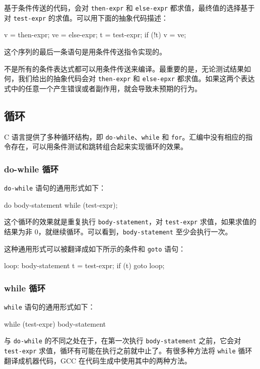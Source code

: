 基于条件传送的代码，会对 \verb|then-expr| 和 \verb|else-expr| 都求值，最终值的选择基于对 \verb|test-expr| 的求值。可以用下面的抽象代码描述：
\begin{cppcode}
v = then-expr;
ve = else-expr;
t = test-expr;
if (!t) v = ve;
\end{cppcode}
这个序列的最后一条语句是用条件传送指令实现的。

不是所有的条件表达式都可以用条件传送来编译。最重要的是，无论测试结果如何，我们给出的抽象代码会对 \verb|then-expr| 和 \verb|else-epxr| 都求值。如果这两个表达式中的任意一个产生错误或者副作用，就会导致未预期的行为。

\subsection{循环}

C 语言提供了多种循环结构，即 \verb|do-while|、\verb|while| 和 \verb|for|。汇编中没有相应的指令存在，可以用条件测试和跳转组合起来实现循环的效果。

\subsubsection{do-while 循环}

\verb|do-while| 语句的通用形式如下：
\begin{cppcode}
do
  body-statement
  while (test-expr);
\end{cppcode}
这个循环的效果就是重复执行 \verb|body-statement|，对 \verb|test-expr| 求值，如果求值的结果为非 0，就继续循环。可以看到，\verb|body-statement| 至少会执行一次。

这种通用形式可以被翻译成如下所示的条件和 \verb|goto| 语句：
\begin{cppcode}
loop:
  body-statement
  t = test-expr;
  if (t)
    goto loop;
\end{cppcode}

\subsubsection{while 循环}

\verb|while| 语句的通用形式如下：
\begin{cppcode}
while (test-expr)
  body-statement
\end{cppcode}
与 \verb|do-while| 的不同之处在于，在第一次执行 \verb|body-statement| 之前，它会对 \verb|test-expr| 求值，循环有可能在执行之前就中止了。有很多种方法将 \verb|while| 循环翻译成机器代码，GCC 在代码生成中使用其中的两种方法。

